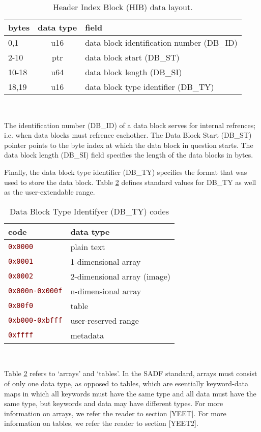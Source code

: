 \documentclass[pagesize=a4]{tufte-book}
\makeatletter
\newcommand{\hex}[1]{\hlred{\texttt{#1}}\label{clsopt:#1}\index{#1 class option@\texttt{#1} class option}\index{class options!#1@\texttt{#1}}}%
\newcommand{\hlred}[1]{\textcolor{Maroon}{#1}}%
\makeatother
\begin{document}
\begin{table}[ht]
	\centering
	\selectfont
	\begin{tabular}{lcl}
		\toprule
		bytes & data type & field\\
		\midrule
		0,1 & u16 & data block identification number (DB\_ID)\\
		2-10 & ptr & data block start (DB\_ST)\\
		10-18 & u64 & data block length (DB\_SI)\\
		18,19 & u16 & data block type identifier (DB\_TY)\\
		\bottomrule
	\end{tabular}
	~\label{tab:hib_fields}
	\caption{Header Index Block (HIB) data layout.}	
\end{table}

The identification number (DB\_ID) of a data block serves for internal refrences; i.e. when data blocks must refrence eachother. The Data Block Start (DB\_ST) pointer points to the byte index at which the data block in question starts. The data block length (DB\_SI) field specifies the length of the data blocks in bytes.

Finally, the data block type identifier (DB\_TY) specifies the format that was
used to store the data block. Table \ref{tab:data_block_type_codes} defines standard values for DB\_TY as well as the user-extendable range.

\begin{table}[ht]
	\centering
	\selectfont
	\begin{tabular}{ll}
		\toprule
		code & data type\\
		\midrule
		\hex{0x0000} & plain text\\
		\hex{0x0001} & 1-dimensional array\\
		\hex{0x0002} & 2-dimensional array (image)\\
		\hex{0x000n-0x000f} & n-dimensional array\\
		\hex{0x00f0} & table\\
		\hex{0xb000-0xbfff} & user-reserved range\\
		\hex{0xffff} & metadata\\
		\bottomrule
	\end{tabular}
	~\label{tab:data_block_type_codes}
	\caption{Data Block Type Identifyer (DB\_TY) codes}
\end{table}

Table \ref{tab:data_block_type_codes} refers to `arrays' and `tables'. In the SADF standard, arrays must consist of only one data type, as opposed to tables, which are esentially keyword-data maps in which all keywords must have the same type and all data must have the same type, but keywords and data may have different types.
For more information on arrays, we refer the reader to section [YEET]. For more information on tables, we refer the reader to section [YEET2].
\end{document}
